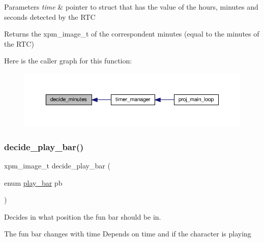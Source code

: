 \begin{DoxyParams}{Parameters}
{\em time} & pointer to struct that has the value of the hours, minutes and seconds detected by the R\+TC\\
\hline
\end{DoxyParams}
\begin{DoxyReturn}{Returns}
the xpm\+\_\+image\+\_\+t of the correspondent minutes (equal to the minutes of the R\+TC) 
\end{DoxyReturn}
Here is the caller graph for this function\+:
\nopagebreak
\begin{figure}[H]
\begin{center}
\leavevmode
\includegraphics[width=350pt]{group__loading__xpms_gae641aba4324c1f6c45eccb9d01822bd4_icgraph}
\end{center}
\end{figure}
\mbox{\label{group__loading__xpms_gad678e45b98e3cc05dca5b24dad2be564}} 
\subsubsection{\texorpdfstring{decide\+\_\+play\+\_\+bar()}{decide\_play\_bar()}}
{\footnotesize\ttfamily xpm\+\_\+image\+\_\+t decide\+\_\+play\+\_\+bar (\begin{DoxyParamCaption}\item[{enum \hyperlink{group__types_gaac3396b3def300539a13396b352b7fca}{play\+\_\+bar}}]{pb }\end{DoxyParamCaption})}



Decides in what position the fun bar should be in. 

The fun bar changes with time Depends on time and if the character is playing


